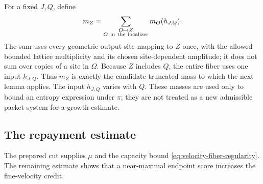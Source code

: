 For a fixed \(J,Q\), define
\begin{equation}
 m_Z=\sum_{\substack{O\mapsto Z\\ O\ {\rm in\ the\ localizer}}}
             m_O(h_{J,Q}) .
 \label{eq:repayment-candidate-mass}
\end{equation}
The sum uses every geometric output site mapping to \(Z\) once,
with the allowed bounded lattice multiplicity and its chosen
site-dependent amplitude; it does not sum over copies of a site in
\(\Omega\).  Because \(Z\) includes \(Q\), the entire fiber uses
one input \(h_{J,Q}\).  Thus \(m_Z\) is exactly the
candidate-truncated mass to which the next lemma applies.
The input \(h_{J,Q}\) varies with \(Q\).  These masses are used
only to bound an entropy expression under \(\pi\); they are not
treated as a new admissible packet system for a growth estimate.

\subsection{The repayment estimate}

The prepared cut supplies \(\mu\) and the capacity bound
\eqref{eq:velocity-fiber-regularity}.  The remaining estimate shows
that a near-maximal endpoint score increases the fine-velocity credit.

